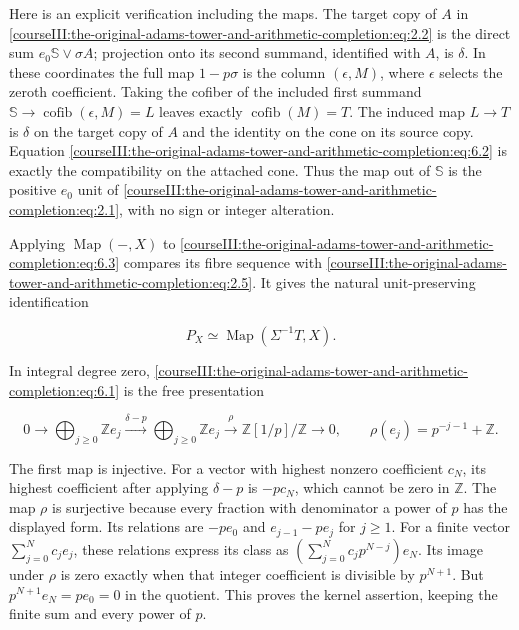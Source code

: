 Here is an explicit verification including the maps. The target copy of \(A\) in \eqref{courseIII:the-original-adams-tower-and-arithmetic-completion:eq:2.2} is the direct sum \(e_0\mathbb S\vee\sigma A\); projection onto its second summand, identified with \(A\), is \(\delta\). In these coordinates the full map \(1-p\sigma\) is the column \((\epsilon,M)\), where \(\epsilon\) selects the zeroth coefficient. Taking the cofiber of the included first summand \(\mathbb S\to\operatorname{cofib}(\epsilon,M)=L\) leaves exactly \(\operatorname{cofib}(M)=T\). The induced map \(L\to T\) is \(\delta\) on the target copy of \(A\) and the identity on the cone on its source copy. Equation \eqref{courseIII:the-original-adams-tower-and-arithmetic-completion:eq:6.2} is exactly the compatibility on the attached cone. Thus the map out of \(\mathbb S\) is the positive \(e_0\) unit of \eqref{courseIII:the-original-adams-tower-and-arithmetic-completion:eq:2.1}, with no sign or integer alteration.

Applying \(\operatorname{Map}(-,X)\) to \eqref{courseIII:the-original-adams-tower-and-arithmetic-completion:eq:6.3} compares its fibre sequence with \eqref{courseIII:the-original-adams-tower-and-arithmetic-completion:eq:2.5}. It gives the natural unit-preserving identification

\begin{equation}
P_X\simeq\operatorname{Map}(\Sigma^{-1}T,X).
\label{courseIII:the-original-adams-tower-and-arithmetic-completion:eq:6.4}
\end{equation}

In integral degree zero, \eqref{courseIII:the-original-adams-tower-and-arithmetic-completion:eq:6.1} is the free presentation

\begin{equation}
0\longrightarrow\bigoplus_{j\geq0}\mathbb Ze_j
\xrightarrow{\delta-p}\bigoplus_{j\geq0}\mathbb Ze_j
\xrightarrow{\rho}\mathbb Z[1/p]/\mathbb Z\longrightarrow0,
\qquad \rho(e_j)=p^{-j-1}+\mathbb Z.
\label{courseIII:the-original-adams-tower-and-arithmetic-completion:eq:6.5}
\end{equation}

The first map is injective. For a vector with highest nonzero coefficient \(c_N\), its highest coefficient after applying \(\delta-p\) is \(-pc_N\), which cannot be zero in \(\mathbb Z\). The map \(\rho\) is surjective because every fraction with denominator a power of \(p\) has the displayed form. Its relations are \(-pe_0\) and \(e_{j-1}-pe_j\) for \(j\geq1\). For a finite vector \(\sum_{j=0}^Nc_je_j\), these relations express its class as
\((\sum_{j=0}^Nc_jp^{N-j})e_N\).
Its image under \(\rho\) is zero exactly when that integer coefficient is divisible by \(p^{N+1}\). But \(p^{N+1}e_N=pe_0=0\) in the quotient. This proves the kernel assertion, keeping the finite sum and every power of \(p\).

